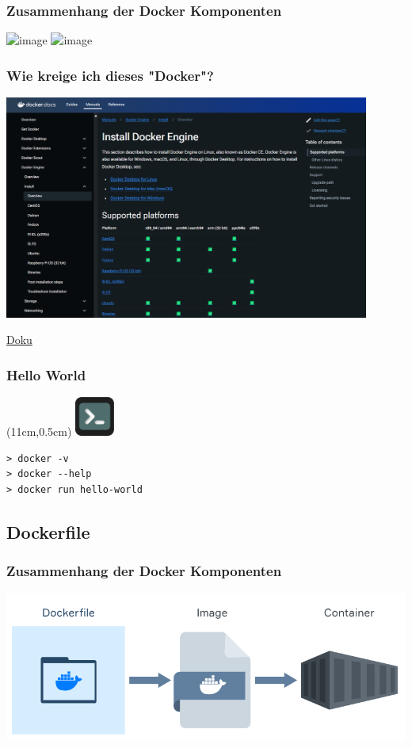 \documentclass[22pt]{beamer}
\newcommand{\terminal}{
    \begin{textblock*}{1.3cm}(11cm,0.5cm) %
    \includegraphics[width=1.3cm]{Bilder/terminal2.png}
    \end{textblock*}
}
\begin{document}
\begin{frame}[c]
    \frametitle{Zusammenhang der Docker Komponenten}
        \includegraphics<1>[width=1\textwidth]{Bilder/Docker-Ablauf.png}
        \includegraphics<2>[width=1\textwidth]{Bilder/dockercommand.png}
\end{frame}

\begin{frame}[c]
    \frametitle{Wie kreige ich dieses "Docker"?}
    \includegraphics[width=0.9\textwidth]{Bilder/Installation.png}

    \href{https://docs.docker.com/engine/install}{Doku}
\end{frame}

\begin{frame}[fragile,t]
    \frametitle{Hello World}
    \terminal
\begin{verbatim}
> docker -v
> docker --help
> docker run hello-world
\end{verbatim}
\end{frame}

\subsection{Dockerfile}
\begin{frame}[c]
    \frametitle{Zusammenhang der Docker Komponenten}
    \includegraphics[width=1\textwidth]{Bilder/Docker-Ablauf_dark.png}
\end{frame}
\end{document}
